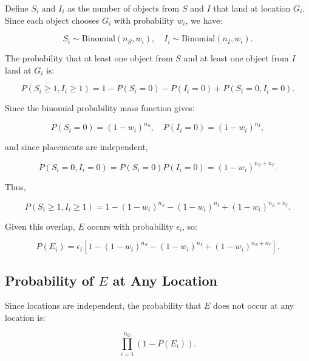 \documentclass[11pt]{article}
\begin{document}
Define $ S_i $ and $ I_i $ as the number of objects from $ S $ and $ I $ that land at location $ G_i $. Since each object chooses $ G_i $ with probability $ w_i $, we have:

\begin{equation}
S_i \sim \text{Binomial}(n_S, w_i), \quad I_i \sim \text{Binomial}(n_I, w_i).
\end{equation}

The probability that at least one object from $ S $ and at least one object from $ I $ land at $ G_i $ is:

\begin{equation}
P(S_i \geq 1, I_i \geq 1) = 1 - P(S_i = 0) - P(I_i = 0) + P(S_i = 0, I_i = 0).
\end{equation}

Since the binomial probability mass function gives:

\begin{equation}
P(S_i = 0) = (1 - w_i)^{n_S}, \quad P(I_i = 0) = (1 - w_i)^{n_I},
\end{equation}

and since placements are independent,

\begin{equation}
P(S_i = 0, I_i = 0) = P(S_i = 0) P(I_i = 0) = (1 - w_i)^{n_S + n_I}.
\end{equation}

Thus,

\begin{equation}
P(S_i \geq 1, I_i \geq 1) = 1 - (1 - w_i)^{n_S} - (1 - w_i)^{n_I} + (1 - w_i)^{n_S + n_I}.
\end{equation}

Given this overlap, $ E $ occurs with probability $ \epsilon_i $, so:

\begin{equation}
P(E_i) = \epsilon_i \left[ 1 - (1 - w_i)^{n_S} - (1 - w_i)^{n_I} + (1 - w_i)^{n_S + n_I} \right].
\end{equation}

\subsection{Probability of $ E $ at Any Location}

Since locations are independent, the probability that $ E $ does not occur at any location is:

\begin{equation}
\prod_{i=1}^{n_G} \left( 1 - P(E_i) \right).
\end{equation}
\end{document}
